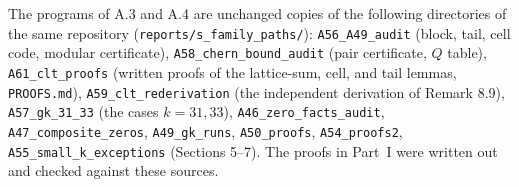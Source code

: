 The programs of A.3 and A.4 are unchanged copies of the following directories of the same repository (\texttt{reports/s\_family\_paths/}): \texttt{A56\_A49\_audit} (block, tail, cell code, modular certificate), \texttt{A58\_chern\_bound\_audit} (pair certificate, \(Q\) table), \texttt{A61\_clt\_proofs} (written proofs of the lattice-sum, cell, and tail lemmas, \texttt{PROOFS.md}), \texttt{A59\_clt\_rederivation} (the independent derivation of Remark 8.9), \texttt{A57\_gk\_31\_33} (the cases \(k=31,33\)), \texttt{A46\_zero\_facts\_audit}, \texttt{A47\_composite\_zeros}, \texttt{A49\_gk\_runs}, \texttt{A50\_proofs}, \texttt{A54\_proofs2}, \texttt{A55\_small\_k\_exceptions} (Sections 5--7). The proofs in Part~I were written out and checked against these sources.
